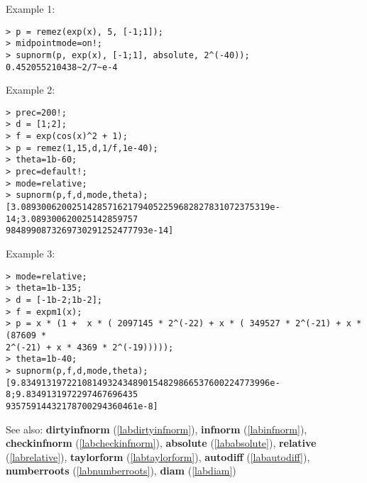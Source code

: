 \noindent Example 1: 
\begin{center}\begin{minipage}{15cm}\begin{Verbatim}[frame=single]
> p = remez(exp(x), 5, [-1;1]);
> midpointmode=on!;
> supnorm(p, exp(x), [-1;1], absolute, 2^(-40));
0.452055210438~2/7~e-4
\end{Verbatim}
\end{minipage}\end{center}
\noindent Example 2: 
\begin{center}\begin{minipage}{15cm}\begin{Verbatim}[frame=single]
> prec=200!;
> d = [1;2];
> f = exp(cos(x)^2 + 1);
> p = remez(1,15,d,1/f,1e-40);
> theta=1b-60;
> prec=default!;
> mode=relative;
> supnorm(p,f,d,mode,theta);
[3.0893006200251428571621794052259682827831072375319e-14;3.089300620025142859757
9848990873269730291252477793e-14]
\end{Verbatim}
\end{minipage}\end{center}
\noindent Example 3: 
\begin{center}\begin{minipage}{15cm}\begin{Verbatim}[frame=single]
> mode=relative;
> theta=1b-135;
> d = [-1b-2;1b-2];
> f = expm1(x);
> p = x * (1 +  x * ( 2097145 * 2^(-22) + x * ( 349527 * 2^(-21) + x * (87609 * 
2^(-21) + x * 4369 * 2^(-19))))); 
> theta=1b-40;
> supnorm(p,f,d,mode,theta);
[9.8349131972210814932434890154829866537600224773996e-8;9.8349131972297467696435
93575914432178700294360461e-8]
\end{Verbatim}
\end{minipage}\end{center}
See also: \textbf{dirtyinfnorm} (\ref{labdirtyinfnorm}), \textbf{infnorm} (\ref{labinfnorm}), \textbf{checkinfnorm} (\ref{labcheckinfnorm}), \textbf{absolute} (\ref{lababsolute}), \textbf{relative} (\ref{labrelative}), \textbf{taylorform} (\ref{labtaylorform}), \textbf{autodiff} (\ref{labautodiff}), \textbf{numberroots} (\ref{labnumberroots}), \textbf{diam} (\ref{labdiam})
